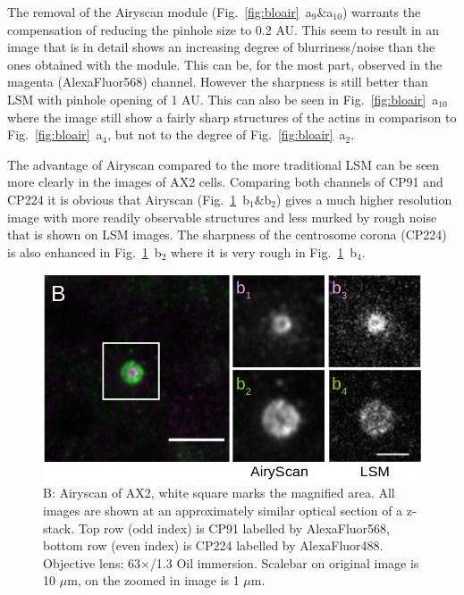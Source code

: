 The removal of the Airyscan module (Fig.~\ref{fig:bloair}~a$_{9}$\&a$_{10}$) warrants the compensation of reducing the pinhole size to 0.2 AU. 
This seem to result in an image that is in detail shows an increasing degree of blurriness/noise than the ones obtained with the module. 
This can be, for the most part, observed in the magenta (AlexaFluor568) channel. 
However the sharpness is still better than LSM with pinhole opening of 1 AU. 
This can also be seen in Fig.~\ref{fig:bloair}~a$_{10}$ where the image still show a fairly sharp structures of the actins in comparison to Fig.~\ref{fig:bloair}~a$_{4}$, but not to the degree of Fig.~\ref{fig:bloair}~a$_{2}$.  

The advantage of Airyscan compared to the more traditional LSM can be seen more clearly in the images of AX2 cells. 
Comparing both channels of CP91 and CP224 it is obvious that Airyscan (Fig.~\ref{fig:dicair}~b$_{1}$\&b$_{2}$) gives a much higher resolution image with more readily observable structures and less murked by rough noise that is shown on LSM images. 
The sharpness of the centrosome corona (CP224) is also enhanced in Fig.~\ref{fig:dicair}~b$_{2}$ where it is very rough in Fig.~\ref{fig:dicair}~b$_{4}$.

\begin{figure}[h!]
\centering
\includegraphics[width=.9\columnwidth]{Exp_6_Airyscan/Figures/DictSl}
\caption{B: Airyscan of AX2, white square marks the magnified area. 
All images are shown at an approximately similar optical section of a z-stack. 
Top row (odd index) is CP91 labelled by AlexaFluor568, bottom row (even index) is CP224 labelled by AlexaFluor488. 
Objective lens: 63$\times$/1.3 Oil immersion. 
Scalebar on original image is 10 $\mu$m, on the zoomed in image is 1 $\mu$m.} 
\label{fig:dicair}
\end{figure}


